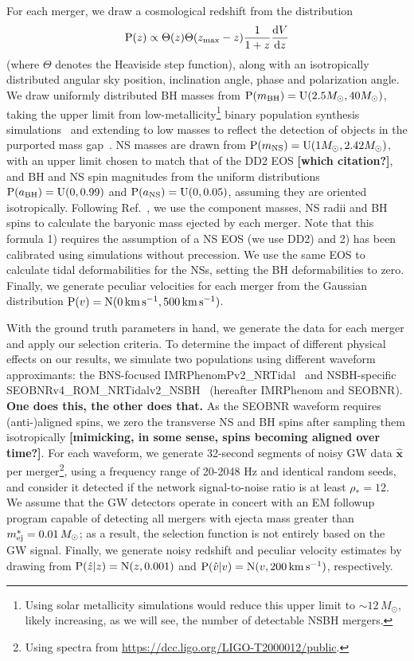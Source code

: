 \documentclass[%
 reprint,
 superscriptaddress,
 nofootinbib,
 amsmath,amssymb,
 aps,
]{revtex4-2}
\newcommand{\msun}{M_\odot}
\newcommand{\vobs}{\ensuremath{\hat{v}}}
\newcommand{\zobs}{\ensuremath{\hat{z}}}
\newcommand{\zmax}{\ensuremath{z_{\rm max}}}
\newcommand{\prob}{\ensuremath{{\rm P}}}
\newcommand{\normal}{{\rm{N}}}
\newcommand{\abh}{a_{\rm BH}}
\newcommand{\ans}{a_{\rm NS}}
\newcommand{\mbh}{m_{\rm BH}}
\newcommand{\mns}{m_{\rm NS}}
\newcommand{\uniform}{{\rm U}}
\newcommand{\step}{\Theta}
\newcommand{\snrmin}{\rho_*}
\newcommand{\mejmin}{m_{\rm ej}^*}
\newcommand{\dgw}{\hat{\bm{x}}}
\newcommand{\kms}{\ensuremath{{\rm km\,s^{-1}}}}
\begin{document}
For each merger, we draw a cosmological redshift from the distribution
\begin{equation}
\prob(z) \propto \step(z) \step(\zmax-z) \frac{1}{1+z} \frac{{\rm d}V}{{\rm d}z}
\end{equation}
(where $\step$ denotes the Heaviside step function), along with an isotropically distributed angular sky position, inclination angle, phase and polarization angle. We draw uniformly distributed BH masses from $\prob(\mbh) = \uniform(2.5\msun, 40\msun)$, taking the upper limit from low-metallicity\footnote{Using solar metallicity simulations would reduce this upper limit to $\sim12\,\msun$, likely increasing, as we will see, the number of detectable NSBH mergers.}
binary population synthesis simulations~\cite{Kruckow_etal:2018} and extending to low masses to reflect the detection of objects in the purported mass gap~\cite{LVC:2020O3acat}. NS masses are drawn from $\prob(\mns) = \uniform(1\msun, 2.42\msun)$, with an upper limit chosen to match that of the DD2 EOS {\bf [which citation?]}, and BH and NS spin magnitudes from the uniform distributions $\prob(\abh) = \uniform(0, 0.99)$ and  $\prob(\ans) = \uniform(0, 0.05)$, assuming they are oriented isotropically. Following Ref.~\cite{Foucart_etal:2018}, we use the component masses, NS radii and BH spins to calculate the baryonic mass ejected by each merger. Note that this formula 1) requires the assumption of a NS EOS (we use DD2) and 2) has been calibrated using simulations without precession. We use the same EOS to calculate tidal deformabilities for the NSs, setting the BH deformabilities to zero. Finally, we generate peculiar velocities for each merger from the Gaussian distribution $\prob(v) = \normal(0\,\kms,500\,\kms)$.

With the ground truth parameters in hand, we generate the data for each merger and apply our selection criteria.  To determine the impact of different physical effects on our results, we simulate two populations using different waveform approximants: the BNS-focused IMRPhenomPv2\_NRTidal~\cite{Dietrich_etal:2019} and NSBH-specific SEOBNRv4\_ROM\_NRTidalv2\_NSBH~\cite{Matas_etal:2020} (hereafter IMRPhenom and SEOBNR). {\bf One does this, the other does that.} As the SEOBNR waveform requires (anti-)aligned spins, we zero the transverse NS and BH spins after sampling them isotropically {\bf [mimicking, in some sense, spins becoming aligned over time?]}. For each waveform, we generate 32-second segments of noisy GW data $\dgw$ per merger\footnote{Using spectra from \url{https://dcc.ligo.org/LIGO-T2000012/public}.}, using a frequency range of 20-2048 Hz and identical random seeds, and consider it detected if the network signal-to-noise ratio is at least $\snrmin = 12$. We assume that the GW detectors operate in concert with an EM followup program capable of detecting all mergers with ejecta mass greater than $\mejmin = 0.01\,M_\odot$; as a result, the selection function is not entirely based on the GW signal. Finally, we generate noisy redshift and peculiar velocity estimates by drawing from $\prob(\zobs|z)=\normal(z,0.001)$ and $\prob(\vobs|v)=\normal(v,200\,\kms)$, respectively.
\end{document}
